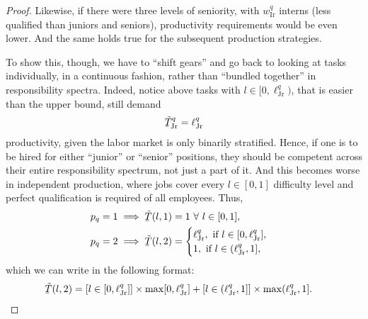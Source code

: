 \documentclass[hidelinks, nonatbib]{elsarticle}
\begin{document}
\begin{lemma}
\begin{proof}
        Likewise, if there were three levels of seniority, with $w_{\text{Ir}}^{q}$ interns (less qualified than juniors and seniors), productivity requirements would be even lower. And the same holds true for the subsequent production strategies.
        
        To show this, though, we have to ``shift gears'' and go back to looking at tasks individually, in a continuous fashion, rather than ``bundled together'' in responsibility spectra. Indeed, notice above tasks with $l \in [0, \ell_{\text{Jr}}^{q})$, that is easier than the upper bound, still demand
        \begin{gather}
            \underaccent{\bar}{\tilde{T}}_{\text{Jr}}^{q}
            =
            \ell_{\text{Jr}}^{q}
        \end{gather}
        productivity, given the labor market is only binarily stratified. Hence, if one is to be hired for either ``junior'' or ``senior'' positions, they should be competent across their entire responsibility spectrum, not just a part of it. And this becomes worse in independent production, where jobs cover every $l \in [0,1]$ difficulty level and perfect qualification is required of all employees. Thus, 
        \begin{align}
            p_q = 1
            &\implies
            \underaccent{\bar}{\tilde{T}}(l, 1)
            = 1
            \
            \forall
            \
            l \in [0,1]
            ,
            \\
            p_q = 2
            &\implies
            \underaccent{\bar}{\tilde{T}}(l, 2)
            = 
            \begin{cases}
                \ell_{\text{Jr}}^{q}, \text{ if } l \in [0, \ell_{\text{Jr}}^{q}],
                \\
                1, \text{ if } l \in (\ell_{\text{Jr}}^{q}, 1],
            \end{cases}
        \end{align}
        which we can write in the following format:
        \begin{align}
            \underaccent{\bar}{\tilde{T}}(l, 2)
            &= 
            [l \in [0, \ell_{\text{Jr}}^{q}]]
            \times
            \max[0, \ell_{\text{Jr}}^{q}]
            +
            [l \in (\ell_{\text{Jr}}^{q}, 1]]
            \times
            \max(\ell_{\text{Jr}}^{q}, 1]
            .
        \end{align}


\end{proof}
\end{lemma}
\end{document}

